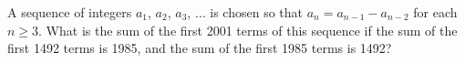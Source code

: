A sequence of integers $a_1$, $a_2$, $a_3$, $\ldots$ is chosen so that $a_n = a_{n - 1} - a_{n - 2}$ for each $n \ge 3$.  What is the sum of the first 2001 terms of this sequence if the sum of the first 1492 terms is 1985, and the sum of the first 1985 terms is 1492?